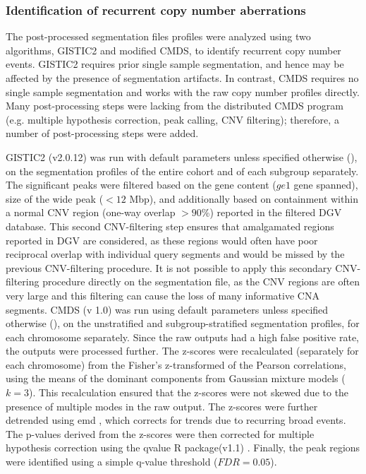 \subsubsection{Identification of recurrent copy number aberrations}

The post-processed segmentation files profiles were analyzed using two algorithms, GISTIC2 and modified CMDS, to identify recurrent copy number events. GISTIC2 requires prior single sample segmentation, and hence may be affected by the presence of segmentation artifacts. In contrast, CMDS requires no single sample segmentation and works with the raw copy number profiles directly. Many post-processing steps were lacking from the distributed CMDS program (e.g. multiple hypothesis correction, peak calling, CNV filtering); therefore, a number of post-processing steps were added.

GISTIC2 (v2.0.12)  was run with default parameters unless specified otherwise (), on the segmentation profiles of the entire cohort and of each subgroup separately. The significant peaks were filtered based on the gene content ($ge 1$ gene spanned), size of the wide peak ($< 12$ Mbp), and additionally based on containment within a normal CNV region (one-way overlap $> 90$\%) reported in the filtered DGV database. This second CNV-filtering step ensures that amalgamated regions reported in DGV are considered, as these regions would often have poor reciprocal overlap with individual query segments and would be missed by the previous CNV-filtering procedure. It is not possible to apply this secondary CNV-filtering procedure directly on the segmentation file, as the CNV regions are often very large and this filtering can cause the loss of many informative CNA segments.
CMDS (v 1.0)  was run using default parameters unless specified otherwise (), on the unstratified and subgroup-stratified segmentation profiles, for each chromosome separately. Since the raw outputs had a high false positive rate, the outputs were processed further. The z-scores were recalculated (separately for each chromosome) from the Fisher’s z-transformed of the Pearson correlations, using the means of the dominant components from Gaussian mixture models ($k = 3$). This recalculation ensured that the z-scores were not skewed due to the presence of multiple modes in the raw output. The z-scores were further detrended using \gls{emd} , which corrects for trends due to recurring broad events. The p-values derived from the z-scores were then corrected for multiple hypothesis correction using the qvalue R package(v1.1) . Finally, the peak regions were identified using a simple q-value threshold ($FDR = 0.05$).

